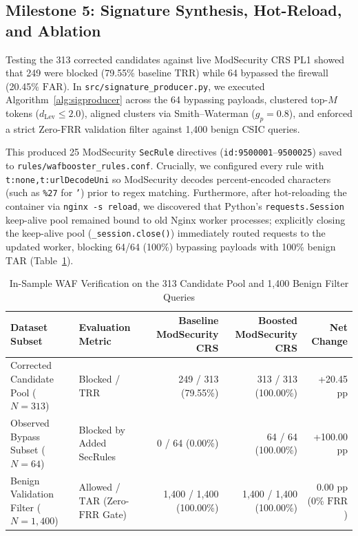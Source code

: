 \documentclass[conference]{IEEEtran}
\newcommand{\TRR}{\ensuremath{\mathrm{TRR}}}
\newcommand{\TAR}{\ensuremath{\mathrm{TAR}}}
\newcommand{\FAR}{\ensuremath{\mathrm{FAR}}}
\newcommand{\FRR}{\ensuremath{\mathrm{FRR}}}
\begin{document}
\subsection{Milestone 5: Signature Synthesis, Hot-Reload, and Ablation}
Testing the 313 corrected candidates against live ModSecurity CRS PL1 showed that 249 were blocked (79.55\% baseline \TRR{}) while 64 bypassed the firewall (20.45\% \FAR{}). In \texttt{src/signature\_producer.py}, we executed Algorithm~\ref{alg:sigproducer} across the 64 bypassing payloads, clustered top-$M$ tokens ($d_{\mathrm{Lev}} \le 2.0$), aligned clusters via Smith--Waterman ($g_p = 0.8$), and enforced a strict Zero-\FRR{} validation filter against 1,400 benign CSIC queries.

This produced 25 ModSecurity \texttt{SecRule} directives (\texttt{id:9500001}--\texttt{9500025}) saved to \texttt{rules/wafbooster\_rules.conf}. Crucially, we configured every rule with \texttt{t:none,t:urlDecodeUni} so ModSecurity decodes percent-encoded characters (such as \texttt{\%27} for \texttt{'}) prior to regex matching. Furthermore, after hot-reloading the container via \texttt{nginx -s reload}, we discovered that Python's \texttt{requests.Session} keep-alive pool remained bound to old Nginx worker processes; explicitly closing the keep-alive pool (\texttt{\_session.close()}) immediately routed requests to the updated worker, blocking 64/64 (100\%) bypassing payloads with 100\% benign \TAR{} (Table~\ref{tab:insample}).

\begin{table}[t]
\centering
\caption{In-Sample WAF Verification on the 313 Candidate Pool and 1,400 Benign Filter Queries}
\label{tab:insample}
\footnotesize
\begin{tabular}{llrrr}
\toprule
Dataset Subset & Evaluation Metric & Baseline ModSecurity CRS & Boosted ModSecurity CRS & Net Change\\
\midrule
Corrected Candidate Pool ($N=313$) & Blocked / \TRR{} & 249 / 313 (79.55\%) & 313 / 313 (100.00\%) & +20.45 pp\\
Observed Bypass Subset ($N=64$) & Blocked by Added SecRules & 0 / 64 (0.00\%) & 64 / 64 (100.00\%) & +100.00 pp\\
Benign Validation Filter ($N=1,400$) & Allowed / \TAR{} (Zero-\FRR{} Gate) & 1,400 / 1,400 (100.00\%) & 1,400 / 1,400 (100.00\%) & 0.00 pp (0\% \FRR{})\\
\bottomrule
\end{tabular}
\end{table}
\end{document}
